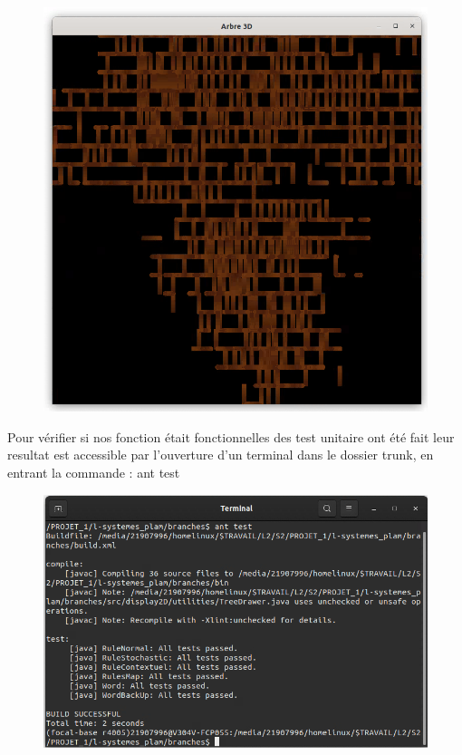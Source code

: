 \documentclass[a4paper,12pt]{article}
\begin{document}
\begin{figure}[h]
\centering
\includegraphics[scale=0.42]{Gameplay/3D_tree.png}
\end{figure}

\newpage
Pour vérifier si nos fonction était fonctionnelles des test unitaire ont été fait leur resultat est accessible par l'ouverture d'un terminal dans le dossier trunk, en entrant la commande : ant test

\begin{figure}[h]
\centering
\includegraphics[scale=0.6]{Gameplay/ant_test.png}
\end{figure}
\end{document}
